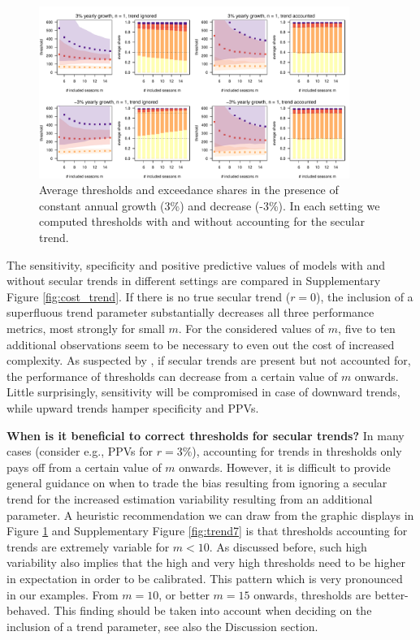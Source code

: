 \documentclass[12pt]{article}
\begin{document}
\begin{figure}
\begin{center}
\includegraphics[width = 0.9\textwidth]{figure/plot_trend3_fr_small.pdf}
\end{center}
\caption{Average thresholds and exceedance shares in the presence of constant annual growth (3\%) and decrease (-3\%). In each setting we computed thresholds with and without accounting for the secular trend.}
\label{fig:trend}
\end{figure}

The sensitivity, specificity and positive predictive values of models with and without secular trends in different settings are compared in Supplementary Figure \ref{fig:cost_trend}. If there is no true secular trend ($r = 0$), the inclusion of a superfluous trend parameter substantially decreases all three performance metrics, most strongly for small $m$. For the considered values of $m$, five to ten additional observations seem to be necessary to even out the cost of increased complexity. As suspected by \cite{Vega2013}, if secular trends are present but not accounted for, the performance of thresholds can decrease from a certain value of $m$ onwards. Little surprisingly, sensitivity will be compromised in case of downward trends, while upward trends hamper specificity and PPVs.

\noindent \textbf{When is it beneficial to correct thresholds for secular trends?} In many cases (consider e.g., PPVs for $r = 3\%$), accounting for trends in thresholds only pays off from a certain value of $m$ onwards. However, it is difficult to provide general guidance on when to trade the bias resulting from ignoring a secular trend for the increased estimation variability resulting from an additional parameter. A heuristic recommendation we can draw from the graphic displays in Figure \ref{fig:trend} and Supplementary Figure \ref{fig:trend7} is that thresholds accounting for trends are extremely variable for $m < 10$. As discussed before, such high variability also implies that the high and very high thresholds need to be higher in expectation in order to be calibrated. This pattern which is very pronounced in our examples. From $m = 10$, or better $m = 15$ onwards, thresholds are better-behaved. This finding should be taken into account when deciding on the inclusion of a trend parameter, see also the Discussion section.
\end{document}
